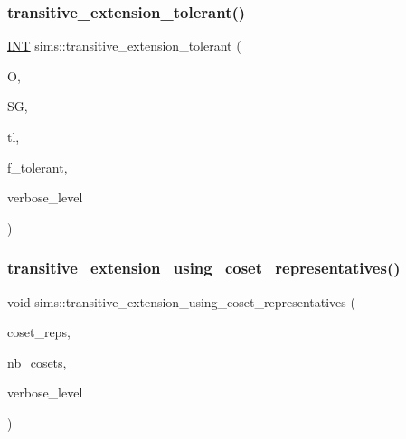 \mbox{\label{classsims_a826450b2a9f6edb57f02dd84cb43dd28}} 
\subsubsection{\texorpdfstring{transitive\+\_\+extension\+\_\+tolerant()}{transitive\_extension\_tolerant()}}
{\footnotesize\ttfamily \mbox{\hyperlink{galois_8h_a09fddde158a3a20bd2dcadb609de11dc}{I\+NT}} sims\+::transitive\+\_\+extension\+\_\+tolerant (\begin{DoxyParamCaption}\item[{\mbox{\hyperlink{classschreier}{schreier}} \&}]{O,  }\item[{\mbox{\hyperlink{classvector__ge}{vector\+\_\+ge}} \&}]{SG,  }\item[{\mbox{\hyperlink{galois_8h_a09fddde158a3a20bd2dcadb609de11dc}{I\+NT}} $\ast$}]{tl,  }\item[{\mbox{\hyperlink{galois_8h_a09fddde158a3a20bd2dcadb609de11dc}{I\+NT}}}]{f\+\_\+tolerant,  }\item[{\mbox{\hyperlink{galois_8h_a09fddde158a3a20bd2dcadb609de11dc}{I\+NT}}}]{verbose\+\_\+level }\end{DoxyParamCaption})}

\mbox{\label{classsims_a16b0c199eba22eaf54b3900896725c44}} 
\subsubsection{\texorpdfstring{transitive\+\_\+extension\+\_\+using\+\_\+coset\+\_\+representatives()}{transitive\_extension\_using\_coset\_representatives()}}
{\footnotesize\ttfamily void sims\+::transitive\+\_\+extension\+\_\+using\+\_\+coset\+\_\+representatives (\begin{DoxyParamCaption}\item[{\mbox{\hyperlink{galois_8h_a09fddde158a3a20bd2dcadb609de11dc}{I\+NT}} $\ast$}]{coset\+\_\+reps,  }\item[{\mbox{\hyperlink{galois_8h_a09fddde158a3a20bd2dcadb609de11dc}{I\+NT}}}]{nb\+\_\+cosets,  }\item[{\mbox{\hyperlink{galois_8h_a09fddde158a3a20bd2dcadb609de11dc}{I\+NT}}}]{verbose\+\_\+level }\end{DoxyParamCaption})}

